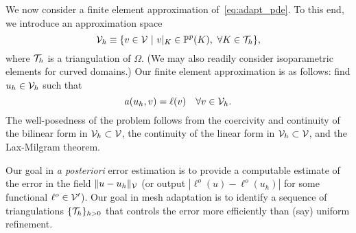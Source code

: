 We now consider a finite element approximation of~\eqref{eq:adapt_pde}.  To this end, we introduce an approximation space
\begin{equation*}
  \mathcal{V}_h \equiv \{ v \in \mathcal{V} \ | \ v|_K \in \mathbb{P}^p(K), \ \forall K \in \mathcal{T}_h \},
\end{equation*}
where $\mathcal{T}_h$ is a triangulation of $\Omega$.  (We may also readily consider isoparametric elements for curved domains.) Our finite element approximation is as follows: find $u_h \in \mathcal{V}_h$ such that
\begin{equation*}
  a(u_h,v) = \ell(v) \quad \forall v \in \mathcal{V}_h.
\end{equation*}
The well-posedness of the problem follows from the coercivity and continuity of the bilinear form in $\mathcal{V}_h \subset \mathcal{V}$, the continuity of the linear form in $\mathcal{V}_h \subset \mathcal{V}$, and the Lax-Milgram theorem.

Our goal in \textit{a posteriori} error estimation is to provide a computable estimate of the error in the field $ \| u - u_h \|_{\mathcal{V}}$ (or output $| \ell^o(u) - \ell^o(u_h) |$ for some functional $\ell^o \in \mathcal{V}'$). Our goal in mesh adaptation is to identify a sequence of triangulations $\{\mathcal{T}_h\}_{h>0}$ that controls the error more efficiently than (say) uniform refinement. 

